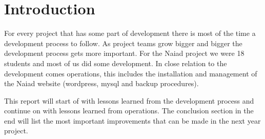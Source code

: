\section{Introduction}\label{sec:introduction}
For every project that has some part of development there is most of the time a development
process to follow. As project teams grow bigger and bigger the development
process gets more important. For the Naiad project we were 18 students and most
of us did some development. In close relation to the development comes
operations, this includes the installation and management of the Naiad
website (wordpress, mysql and backup procedures).

This report will start of with lessons learned from the development
process and continue on with lessons learned from operations. The conclusion
section in the end will list the most important improvements that can be made
in the next year project.
